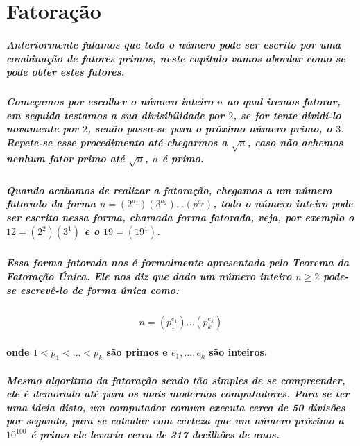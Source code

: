 \section{Fatora\c{c}\~{a}o}

\subparagraph{
Anteriormente falamos que todo o n\'umero pode ser escrito por uma combina\c{c}\~ao de fatores primos, neste cap\'itulo vamos abordar como se pode obter estes fatores.
}
\subparagraph{
Come\c{c}amos por escolher o n\'umero inteiro $n$ ao qual iremos fatorar, em seguida testamos a sua divisibilidade por $2$, se for tente divid\'i-lo novamente por $2$, sen\~ao passa-se para o pr\'oximo n\'umero primo, o $3$. Repete-se esse procedimento at\'e chegarmos a $\sqrt{n}$, caso n\~ao achemos nenhum fator primo at\'e $\sqrt{n}$, $n$ \'e primo.
}
\subparagraph{
Quando acabamos de realizar a fatora\c{c}\~ao, chegamos a um n\'umero fatorado da forma $n = (2^{a_{1}})(3^{a_{2}}) ... (p^{a_{p}})$, todo o n\'umero inteiro pode ser escrito nessa forma, chamada forma fatorada, veja, por exemplo o $12 = (2^2)(3^1)$ e o $19 = (19^1)$.
}
\subparagraph{
Essa forma fatorada nos \'e formalmente apresentada pelo \textit{Teorema da Fatora\c{c}\~ao \'Unica}. Ele nos diz que dado um n\'umero inteiro $n\geq2$ pode-se escrev\^e-lo de forma \'unica como:
}
\[	
	\begin{array}{c}
		\textit{$n = (p^{e_{1}}_{1}) ... (p^{e_{k}}_{k}) $}
	\end{array}
\]
\paragraph{
onde $1 < p_1 < ... < p_k $ s\~ao primos e $e_1, ..., e_k$ s\~ao inteiros.
}
\subparagraph{
Mesmo algoritmo da fatora\c{c}\~ao sendo t\~ao simples de se compreender, ele \'e demorado at\'e para os mais modernos computadores. Para se ter uma ideia disto, um computador comum executa cerca de {50} divis\~oes por segundo, para se calcular com certeza que um n\'umero pr\'oximo a $10^{100}$ \'e primo ele levaria cerca de {317} decilh\~oes de anos.
}
